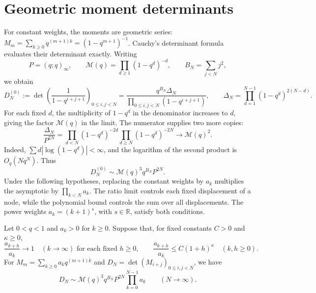 \documentclass[11pt]{article}
\begin{document}
\section{Geometric moment determinants}\label{sec:geometric-moments}

For constant weights, the moments are geometric series:
$M_m=\sum_{k\ge0}q^{(m+1)k}=(1-q^{m+1})^{-1}$.
Cauchy's determinant formula evaluates their determinant exactly.
Writing
\[
 P=(q;q)_\infty,\qquad
 \mathcal M(q)=\prod_{d\ge1}(1-q^d)^{-d},\qquad
 B_N=\sum_{j<N}j^2,
\]
we obtain
\begin{equation}\label{eq:cauchy-model}
 D_N^{(0)}:=\det\left(\frac1{1-q^{i+j+1}}\right)_{0\le i,j<N}
 =\frac{q^{B_N}\Delta_N}{\prod_{0\le i,j<N}(1-q^{i+j+1})},
 \qquad
 \Delta_N=\prod_{d=1}^{N-1}(1-q^d)^{2(N-d)}.
\end{equation}
For each fixed $d$, the multiplicity of $1-q^d$ in the denominator
increases to $d$, giving the factor $\mathcal M(q)$ in the limit.
The numerator supplies two more copies:
\[
 \frac{\Delta_N}{P^{2N}}
 =\prod_{d<N}(1-q^d)^{-2d}\prod_{d\ge N}(1-q^d)^{-2N}
 \longrightarrow\mathcal M(q)^2.
\]
Indeed, $\sum d|\log(1-q^d)|<\infty$, and the logarithm of the
second product is $O_q(Nq^N)$. Thus
\begin{equation}\label{eq:cauchy-model-limit}
 D_N^{(0)}\sim\mathcal M(q)^3q^{B_N}P^{2N}.
\end{equation}
Under the following hypotheses, replacing the constant weights by
$a_k$ multiplies the asymptotic by $\prod_{k<N}a_k$. The ratio limit
controls each fixed displacement of a node, while the polynomial
bound controls the sum over all displacements. The power weights
$a_k=(k+1)^s$, with $s\in\mathbb R$, satisfy both conditions.

\begin{theorem}\label{thm:geometric-moments}
Let $0<q<1$ and $a_k>0$ for $k\ge0$. Suppose that, for fixed
constants $C>0$ and $\kappa\ge0$,
\begin{equation}\label{eq:automatic-shift-bound}
 \frac{a_{k+h}}{a_k}\longrightarrow1\quad(k\to\infty)
 \text{ for each fixed }h\ge0,
 \qquad
 \frac{a_{k+h}}{a_k}\le C(1+h)^\kappa\quad(k,h\ge0).
\end{equation}
For $M_m=\sum_{k\ge0}a_kq^{(m+1)k}$ and
$D_N=\det(M_{i+j})_{0\le i,j<N}$, we have
\begin{equation}\label{eq:geometric-limit}
 D_N\sim\mathcal M(q)^3q^{B_N}P^{2N}\prod_{k=0}^{N-1}a_k
 \qquad(N\to\infty).
\end{equation}
\end{theorem}
\end{document}
